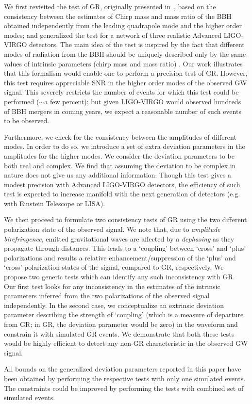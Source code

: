 \documentclass[prd,preprintnumbers,twocolumn,eqsecnum,floatfix,a4paper,nofootinbib,superscriptaddress]{revtex4}
\begin{document}
We first revisited the test of GR, originally presented in~\cite{dhanpal2018}, based on the consistency between the estimates of Chirp mass and mass ratio of the BBH obtained independently from the leading quadrapole mode and the higher order modes; and generalized the test for a network of three realistic Advanced LIGO-VIRGO detectors. The main idea of the test is inspired by the fact that different modes of radiation from the BBH should be uniquely described only by the same values of intrinsic parameters (chirp mass and mass ratio) . Our work illustrates that this formalism would enable one to perform a precision test of GR. However, this test requires appreciable SNR in the higher order modes of the observed GW signal. This severely restricts the number of events for which this test could be performed ($\sim$a few percent); but given LIGO-VIRGO would observed hundreds of BBH mergers in coming years, we expect a reasonable number of such events to be observed.

Furthermore, we check for the consistency between the amplitudes of different modes. In order to do so, we introduce a set of extra deviation parameters in the amplitudes for the higher modes. We consider the deviation parameters to be both real and complex. We find that assuming the deviation to be complex in nature does not give us any additional information. Though this test gives a modest precision with Advanced LIGO-VIRGO detectors, the efficiency of such test is expected to increase manifold with the next generation of detectors (e.g. with Einstein Telescope or LISA). 

We then proceed to formulate two consistency tests of GR using the two different polarization state of the observed signal. We note that, due to \textit{amplitude birefringence}, emitted gravitational waves are affected by a \textit{dephasing} as they propagate through distances. This leads to a `coupling' between `cross' and `plus' polarizations and results a relative enhancement/suppression of the `plus' and `cross' polarization states of the signal, compared to GR,  respectively. We propose two generic tests which can identify any such inconsistency with GR. Our first test  looks for any inconsistency in the estimates of the intrinsic parameters inferred from the two polarizations of the observed signal independently. In the second case, we conceptualize an extrinsic deviation parameter describing the strength of `coupling' (which is a measure of departure from GR; in GR, the deviation parameter would be zero) in the waveform and constrain it with simulated GR events. We demonstrate that both these tests would be highly efficient to detect any non-GR characteristic in the observed GW signal. 

All bounds on the generalized deviation parameters reported in this paper have been obtained by performing the respective tests with only one simulated events. The constraints could be improved by performing the tests with combined set of simulated events.  
\newpage


\end{document}
